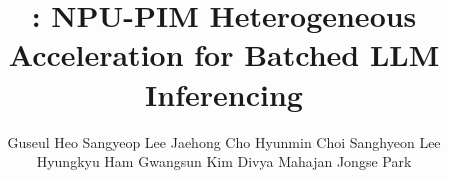 \documentclass[sigplan,screen]{acmart}
\begin{document}
\title{\neupims: NPU-PIM Heterogeneous Acceleration for Batched LLM Inferencing}

\author{
  \hfill
  Guseul Heo\hfill
  Sangyeop Lee\hfill
  Jaehong Cho\hfill
  Hyunmin Choi\hfill
  Sanghyeon Lee\hspace*{\fill} \\
  \hfill
  Hyungkyu Ham\footnotemark[2]\hfill
  Gwangsun Kim\footnotemark[2]\hfill
  Divya Mahajan\footnotemark[4]\hfill
  Jongse Park\hspace*{\fill}
}


%

\renewcommand{\authors}{Guseul Heo, Sangyeop Lee, Jaehong Cho, Hyunmin Choi, Sanghyeon Lee, Hyungkyu Ham, Gwangsun Kim, Divya Mahajan and Jongse Park}
\renewcommand{\shortauthors}{Heo et al.}

\vspace{2ex}



\maketitle %
















\balance



\end{document}
